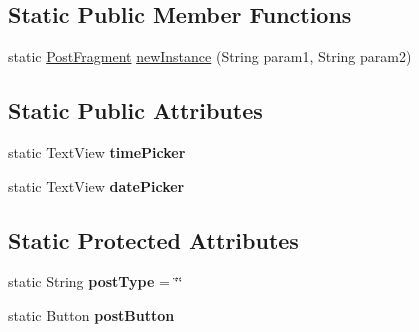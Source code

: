 \subsection*{\-Static \-Public \-Member \-Functions}
\begin{DoxyCompactItemize}
\item 
static \hyperlink{classcom_1_1example_1_1sel_1_1lostfound_1_1PostFragment}{\-Post\-Fragment} \hyperlink{classcom_1_1example_1_1sel_1_1lostfound_1_1PostFragment_a7350f5b81aa9144d9acdeca902676773}{new\-Instance} (\-String param1, \-String param2)
\end{DoxyCompactItemize}
\subsection*{\-Static \-Public \-Attributes}
\begin{DoxyCompactItemize}
\item 
\hypertarget{classcom_1_1example_1_1sel_1_1lostfound_1_1PostFragment_ac6d98a5b689bea76cf1248a20a54d23c}{static \-Text\-View {\bfseries time\-Picker}}\label{classcom_1_1example_1_1sel_1_1lostfound_1_1PostFragment_ac6d98a5b689bea76cf1248a20a54d23c}

\item 
\hypertarget{classcom_1_1example_1_1sel_1_1lostfound_1_1PostFragment_a1c187b07da5262cf568439018a826ef9}{static \-Text\-View {\bfseries date\-Picker}}\label{classcom_1_1example_1_1sel_1_1lostfound_1_1PostFragment_a1c187b07da5262cf568439018a826ef9}

\end{DoxyCompactItemize}
\subsection*{\-Static \-Protected \-Attributes}
\begin{DoxyCompactItemize}
\item 
\hypertarget{classcom_1_1example_1_1sel_1_1lostfound_1_1PostFragment_acb0672afa2382233136ee251bef7149b}{static \-String {\bfseries post\-Type} = \char`\"{}\char`\"{}}\label{classcom_1_1example_1_1sel_1_1lostfound_1_1PostFragment_acb0672afa2382233136ee251bef7149b}

\item 
\hypertarget{classcom_1_1example_1_1sel_1_1lostfound_1_1PostFragment_ab2d93225b515c22ccd209e1382e1a4a1}{static \-Button {\bfseries post\-Button}}\label{classcom_1_1example_1_1sel_1_1lostfound_1_1PostFragment_ab2d93225b515c22ccd209e1382e1a4a1}

\end{DoxyCompactItemize}
